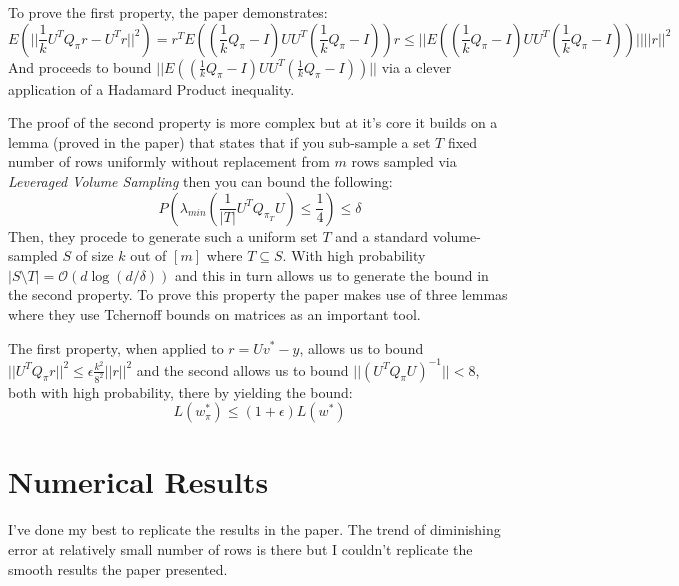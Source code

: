 \documentclass{article}
\begin{document}
        To prove the first property, the paper demonstrates:
        \begin{equation}
            E(||\frac{1}{k}U^TQ_{\pi}r - U^Tr||^2) = r^TE((\frac{1}{k}Q_{\pi}-I)UU^T(\frac{1}{k}Q_{\pi}-I))r \leq ||E((\frac{1}{k}Q_{\pi}-I)UU^T(\frac{1}{k}Q_{\pi}-I))||||r||^2
        \end{equation}
        And proceeds to bound $||E((\frac{1}{k}Q_{\pi}-I)UU^T(\frac{1}{k}Q_{\pi}-I))||$ via a clever application of a Hadamard Product inequality.

        The proof of the second property is more complex but at it's core it builds on a lemma (proved in the paper) that states that if
        you sub-sample a set $T$ fixed number of rows uniformly without replacement from $m$ rows sampled via \textit{Leveraged Volume Sampling}
        then you can bound the following:
        \begin{equation}
            P(\lambda_{min}(\frac{1}{|T|}U^TQ_{\pi_{T}}U) \leq \frac{1}{4}) \leq \delta
        \end{equation}
        Then, they procede to generate such a uniform set $T$ and a standard volume-sampled $S$ of size $k$ out of $[m]$ where $T \subseteq S$.
        With high probability $|S \setminus T|=\mathcal{O}(d\log(d/\delta))$ and this in turn allows us to generate the bound in the second property.
        To prove this property the paper makes use of three lemmas where they use Tchernoff bounds on matrices as an important tool.

        The first property, when applied to $r=Uv^\ast - y$, allows us to bound $||U^TQ_{\pi}r||^2 \leq \epsilon\frac{k^2}{8^2}||r||^2$
        and the second allows us to bound $||(U^TQ_{\pi}U)^{-1}|| < 8$, both with high probability, there by yielding the bound:
        \begin{equation}
            L(w_{\pi}^\ast) \leq (1+\epsilon)L(w^\ast)
        \end{equation}

    \newpage
    \section{Numerical Results}
        I've done my best to replicate the results in the paper.
        The trend of diminishing error at relatively small number of rows is there but I couldn't replicate the smooth results the paper presented.
\end{document}
